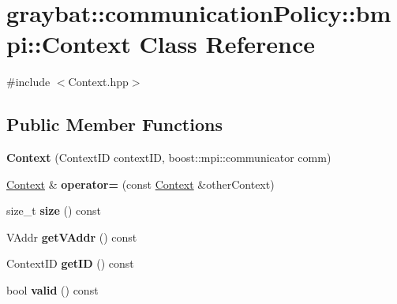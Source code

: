 \hypertarget{classgraybat_1_1communicationPolicy_1_1bmpi_1_1Context}{}\section{graybat\+:\+:communication\+Policy\+:\+:bmpi\+:\+:Context Class Reference}
\label{classgraybat_1_1communicationPolicy_1_1bmpi_1_1Context}


{\ttfamily \#include $<$Context.\+hpp$>$}

\subsection*{Public Member Functions}
\begin{DoxyCompactItemize}
\item 
\hypertarget{classgraybat_1_1communicationPolicy_1_1bmpi_1_1Context_a010e29a166e4ad76b9598bb7c4ffd5eb}{}{\bfseries Context} (Context\+I\+D context\+I\+D, boost\+::mpi\+::communicator comm)\label{classgraybat_1_1communicationPolicy_1_1bmpi_1_1Context_a010e29a166e4ad76b9598bb7c4ffd5eb}

\item 
\hypertarget{classgraybat_1_1communicationPolicy_1_1bmpi_1_1Context_a5a95513936214adcac91f656ada7eda1}{}\hyperlink{classgraybat_1_1communicationPolicy_1_1bmpi_1_1Context}{Context} \& {\bfseries operator=} (const \hyperlink{classgraybat_1_1communicationPolicy_1_1bmpi_1_1Context}{Context} \&other\+Context)\label{classgraybat_1_1communicationPolicy_1_1bmpi_1_1Context_a5a95513936214adcac91f656ada7eda1}

\item 
\hypertarget{classgraybat_1_1communicationPolicy_1_1bmpi_1_1Context_a7468f62fc2b8d95bbd002f4d2544b5bc}{}size\+\_\+t {\bfseries size} () const \label{classgraybat_1_1communicationPolicy_1_1bmpi_1_1Context_a7468f62fc2b8d95bbd002f4d2544b5bc}

\item 
\hypertarget{classgraybat_1_1communicationPolicy_1_1bmpi_1_1Context_a8d085626c0602b1183505792e65d98c2}{}V\+Addr {\bfseries get\+V\+Addr} () const \label{classgraybat_1_1communicationPolicy_1_1bmpi_1_1Context_a8d085626c0602b1183505792e65d98c2}

\item 
\hypertarget{classgraybat_1_1communicationPolicy_1_1bmpi_1_1Context_a1717bea0971b858604306ed73a8a2f7f}{}Context\+I\+D {\bfseries get\+I\+D} () const \label{classgraybat_1_1communicationPolicy_1_1bmpi_1_1Context_a1717bea0971b858604306ed73a8a2f7f}

\item 
\hypertarget{classgraybat_1_1communicationPolicy_1_1bmpi_1_1Context_a98b3900695a9dbc6c56364009fe01d51}{}bool {\bfseries valid} () const \label{classgraybat_1_1communicationPolicy_1_1bmpi_1_1Context_a98b3900695a9dbc6c56364009fe01d51}

\end{DoxyCompactItemize}
